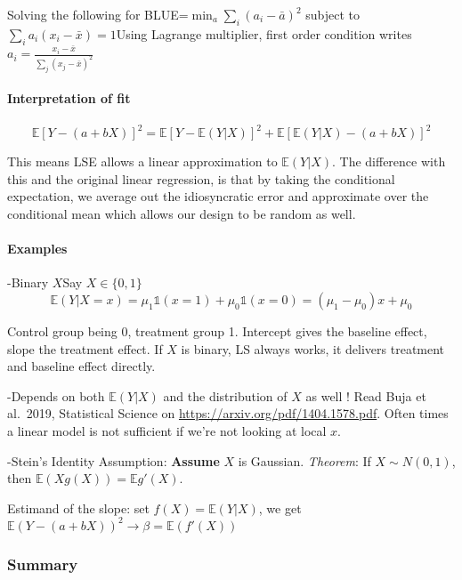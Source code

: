 \documentclass[
]{article}
\begin{document}
Solving the following for BLUE=\(\min_a\sum_i (a_i-\bar{a})^2\) subject
to \(\sum_i a_i(x_i-\bar{x})=1\)\newline  Using Lagrange multiplier,
first order condition writes
\(a_i=\frac{x_i-\bar{x}}{\sum_j (x_j-\bar{x})^2}\)

\hypertarget{interpretation-of-fit}{%
\paragraph{Interpretation of fit}\label{interpretation-of-fit}}

\[\mathbb{E}[Y-(a+bX)]^2=\mathbb{E}[Y-\mathbb{E}(Y|X)]^2+\mathbb{E}[\mathbb{E}(Y|X)-(a+bX)]^2\]

This means LSE allows a linear approximation to \(\mathbb{E}(Y|X)\). The
difference with this and the original linear regression, is that by
taking the conditional expectation, we average out the idiosyncratic
error and approximate over the conditional mean which allows our design
to be random as well.

\hypertarget{examples}{%
\paragraph{Examples}\label{examples}}

-Binary \(X\)\newline  Say \(X\in\{0,1\}\)
\[\mathbb{E}(Y|X=x)=\mu_1\mathbb{1}(x=1)+\mu_0\mathbb{1}(x=0)=(\mu_1-\mu_0)x+\mu_0\]

Control group being 0, treatment group 1. Intercept gives the baseline
effect, slope the treatment effect. If \(X\) is binary, LS always works,
it delivers treatment and baseline effect directly.

-Depends on both \(\mathbb{E}(Y|X)\) and the distribution of \(X\) as
well ! Read Buja et al.~2019, Statistical Science on
\url{https://arxiv.org/pdf/1404.1578.pdf}. Often times a linear model is
not sufficient if we're not looking at local \(x\).

-Stein's Identity Assumption: \textbf{Assume} \(X\) is Gaussian.
\emph{Theorem}: If \(X\sim N(0,1)\), then
\(\mathbb{E}(Xg(X))=\mathbb{E}g'(X)\).

Estimand of the slope: set \(f(X)=\mathbb{E}(Y|X)\), we get
\(\mathbb{E}(Y-(a+bX))^2\to\beta=\mathbb{E}(f'(X))\)

\hypertarget{summary}{%
\subsubsection{Summary}\label{summary}}
\end{document}
